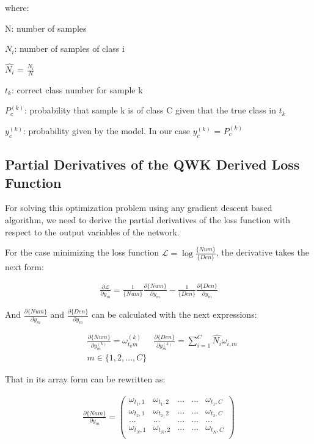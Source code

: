 \documentclass{IOS-Book-Article}
\begin{document}
where:

N: number of samples

$N_i$: number of samples of class i

$\hat{N_i}$ = $\frac{N_i}{N}$

$t_k$: correct class number for sample k

$P_c^{(k)}$: probability that sample k is of class C given that the true class in $t_k$

$y_c^{(k)}$: probability given by the model. In our case $y_c^{(k)}$ = $P_c^{(k)}$

\subsection{Partial Derivatives of the QWK Derived Loss Function}

For solving this optimization problem using any gradient descent based algorithm, we need to derive the partial derivatives of the loss function with respect to the output variables of the network. 

For the case minimizing the loss function $\mathcal{L} =\log{ \frac{\{Num\}}{\{Den\}}}$, the derivative takes the next form:

\begin{equation*}
\begin{aligned}
\frac{\partial \mathcal{L}}{\partial y_m} = \frac{1}{\{Num\}}\frac{\partial \{Num\}}{\partial y_m} - \frac{1}{\{Den\}}
\frac{\partial{\{Den\}}}{\partial y_m}
\end{aligned}
\end{equation*}

And $\frac{\partial \{Num\}}{\partial y_m}$ and $\frac{\partial{\{Den\}}}{\partial y_m}$ can be calculated with the next expressions:

\begin{equation*}
\begin{aligned}
& \frac{\partial \{ Num\}}{\partial y_m^{(k)}} = \omega_{t_k m}^{(k)} & \frac{\partial \{ Den\}}{\partial y_m^{(k)}} = \sum_{i=1}^{C} \hat{N_i} \omega_{i,m}\\
& m \in \{1, 2, ..., C\}
\end{aligned}
\end{equation*}

That in its array form can be rewritten as:


\begin{equation*}
\begin{aligned}
\frac{\partial \{ Num\}}{\partial y_m} =
\begin{pmatrix} 
	\omega_{t_1, 1}     & \omega_{t_1, 2}     & ...     & ... & \omega_{t_1, C}\\ 
	\omega_{t_2, 1}     & \omega_{t_2, 2}     & ...     & ... & \omega_{t_2, C}\\ 
	...					& ...		          & ...     & ... & ...\\
	\omega_{t_N, 1}     & \omega_{t_N, 2}     & ...     & ... & \omega_{t_N, C}\\  
\end{pmatrix}
\end{aligned}
\end{equation*}
\end{document}

